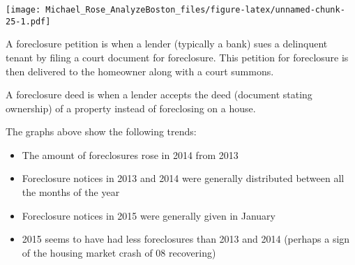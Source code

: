 \documentclass[]{article}
\providecommand{\tightlist}{%
  \setlength{\itemsep}{0pt}\setlength{\parskip}{0pt}}
\begin{document}
\texttt{[image: Michael\_Rose\_AnalyzeBoston\_files/figure-latex/unnamed-chunk-25-1.pdf]}

A foreclosure petition is when a lender (typically a bank) sues a
delinquent tenant by filing a court document for foreclosure. This
petition for foreclosure is then delivered to the homeowner along with a
court summons.

A foreclosure deed is when a lender accepts the deed (document stating
ownership) of a property instead of foreclosing on a house.

The graphs above show the following trends:

\begin{itemize}
\tightlist
\item
  The amount of foreclosures rose in 2014 from 2013
\item
  Foreclosure notices in 2013 and 2014 were generally distributed
  between all the months of the year
\item
  Foreclosure notices in 2015 were generally given in January
\item
  2015 seems to have had less foreclosures than 2013 and 2014 (perhaps a
  sign of the housing market crash of 08 recovering)
\end{itemize}
\end{document}
